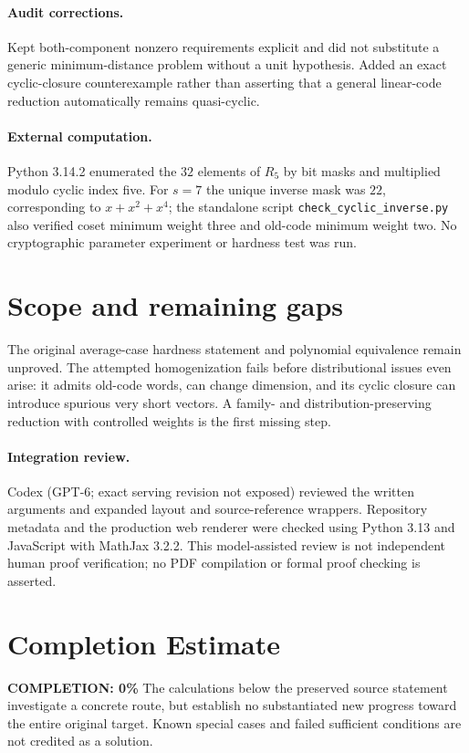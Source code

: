 \documentclass[11pt]{article}
\begin{document}
\paragraph{Audit corrections.} Kept both-component nonzero requirements explicit and did not substitute a generic minimum-distance problem without a unit hypothesis. Added an exact cyclic-closure counterexample rather than asserting that a general linear-code reduction automatically remains quasi-cyclic.
\paragraph{External computation.} Python 3.14.2 enumerated the $32$ elements of $R_5$ by bit masks and multiplied modulo cyclic index five. For $s=7$ the unique inverse mask was $22$, corresponding to $x+x^2+x^4$; the standalone script \texttt{check\_cyclic\_inverse.py} also verified coset minimum weight three and old-code minimum weight two. No cryptographic parameter experiment or hardness test was run.
\section{Scope and remaining gaps}
The original average-case hardness statement and polynomial equivalence remain unproved. The attempted homogenization fails before distributional issues even arise: it admits old-code words, can change dimension, and its cyclic closure can introduce spurious very short vectors. A family- and distribution-preserving reduction with controlled weights is the first missing step.
\paragraph{Integration review.} Codex (GPT-6; exact serving revision not exposed) reviewed the written arguments and expanded layout and source-reference wrappers. Repository metadata and the production web renderer were checked using Python 3.13 and JavaScript with MathJax 3.2.2. This model-assisted review is not independent human proof verification; no PDF compilation or formal proof checking is asserted.

\section{Completion Estimate}
\noindent\textbf{COMPLETION: 0\%}
The calculations below the preserved source statement investigate a concrete route,
but establish no substantiated new progress toward the entire original target.
Known special cases and failed sufficient conditions are not credited as a solution.
\end{document}
